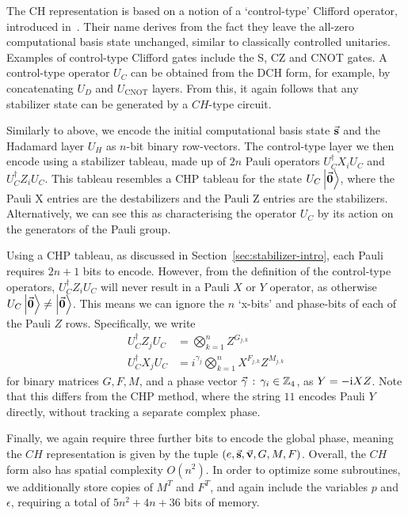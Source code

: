 The CH representation is based on a notion of a `control-type' Clifford operator, introduced in~\cite{Bravyi2018}. Their name derives from the fact they leave the all-zero computational basis state unchanged, similar to classically controlled unitaries. Examples of control-type Clifford gates include the S, CZ and CNOT gates. A control-type operator $U_{C}$ can be obtained from the DCH form, for example, by concatenating $U_{D}$ and $U_{\text{CNOT}}$ layers. From this, it again follows that any stabilizer state can be generated by a $CH$-type circuit.\par
Similarly to above, we encode the initial computational basis state $\va{s}$ and the Hadamard layer $U_{H}$ as $n$-bit binary row-vectors. The control-type layer we then encode using a stabilizer tableau, made up of $2n$ Pauli operators
$U_{C}^{\dagger}X_{i}U_{C}$ and $U_{C}^{\dagger}Z_{i}U_{C}$. This tableau resembles a CHP tableau for the state $U_{C}\ket{\va{0}}$, where the Pauli X entries are the destabilizers and the Pauli Z entries are the stabilizers. Alternatively, we can see this as characterising the operator $U_{C}$ by its action on the generators of the Pauli group.\par
Using a CHP tableau, as discussed in Section~\ref{sec:stabilizer-intro}, each Pauli requires $2n+1$ bits to encode. However, from the definition of the control-type operators, $U_{C}^{\dagger}Z_{i}U_{C}$ will never result in a Pauli $X$ or $Y$ operator, as otherwise $U_{C}\ket{\va{0}}\neq\ket{\va{0}}$. This means we can ignore the $n$ `x-bits' and phase-bits of each of the Pauli $Z$ rows. Specifically, we write
\begin{align}
U_{C}^{\dagger}Z_{j}U_{C} &= \bigotimes_{k=1}^{n} Z^{G_{j,k}} \\
U_{C}^{\dagger}X_{j}U_{C} &= i^{\gamma_{j}}\bigotimes_{k=1}^{n}X^{F_{j,k}}Z^{M_{j,k}}
\end{align}
for binary matrices $G, F, M$, and a phase vector $\va{\gamma}\,:\,\gamma_{i}\in\mathbb{Z}_{4}$, as $Y=-\mathrm{i} XZ$. Note that this differs from the CHP method, where the string $11$ encodes Pauli $Y$ directly, without tracking a separate complex phase.\par
Finally, we again require three further bits to encode the global phase, meaning the $CH$ representation is given by the tuple $(e, \va{s}, \va{v}, G, M, F)$. Overall, the $CH$ form  also has spatial complexity $O(n^{2})$.  In order to optimize some subroutines, we additionally store copies of $M^{T}$ and $F^{T}$, and again include the variables $p$ and $\epsilon$, requiring a total of $5n^{2}+4n+36$ bits of memory.
